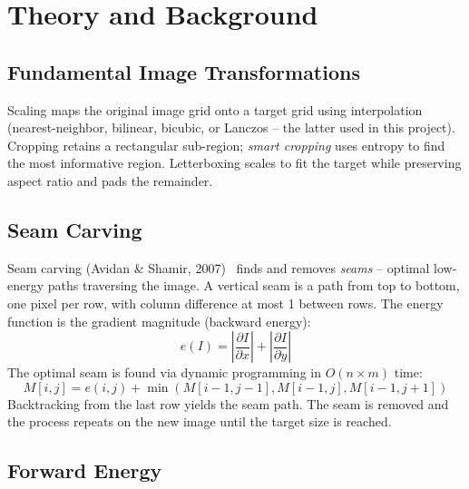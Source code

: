 \documentclass[12pt,a4paper]{article}
\begin{document}
\newpage
\section{Theory and Background}

\subsection{Fundamental Image Transformations}

Scaling maps the original image grid onto a target grid using interpolation (nearest-neighbor, bilinear, bicubic, or Lanczos -- the latter used in this project). Cropping retains a rectangular sub-region; \emph{smart cropping} uses entropy to find the most informative region. Letterboxing scales to fit the target while preserving aspect ratio and pads the remainder.

\subsection{Seam Carving}

Seam carving (Avidan \& Shamir, 2007)~\cite{avidan2007} finds and removes \emph{seams} -- optimal low-energy paths traversing the image. A vertical seam is a path from top to bottom, one pixel per row, with column difference at most 1 between rows. The energy function is the gradient magnitude (backward energy):
\begin{equation}
    e(I) = \left|\frac{\partial I}{\partial x}\right| + \left|\frac{\partial I}{\partial y}\right|
\end{equation}
The optimal seam is found via dynamic programming in $O(n \times m)$ time:
\begin{equation}
    M[i,j] = e(i,j) + \min(M[i-1,j-1], M[i-1,j], M[i-1,j+1])
\end{equation}
Backtracking from the last row yields the seam path. The seam is removed and the process repeats on the new image until the target size is reached.

\subsection{Forward Energy}
\end{document}
